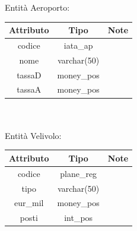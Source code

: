 \documentclass[a4paper,12pt]{report}
\begin{document}
      Entità Aeroporto: \\
      \begin{tabular}{|c|c|c|}
        \hline Attributo & Tipo & Note \\
        \hline codice & iata\_ap & \\
        \hline nome & varchar(50) & \\
        \hline tassaD & money\_pos & \\
        \hline tassaA & money\_pos & \\
        \hline
      \end{tabular} \\ \\
      Entità Velivolo: \\
      \begin{tabular}{|c|c|c|}
        \hline Attributo & Tipo & Note \\
        \hline codice & plane\_reg & \\
        \hline tipo & varchar(50) & \\
        \hline eur\_mil & money\_pos & \\
        \hline posti & int\_pos & \\
        \hline
      \end{tabular} \\ \\

      \newpage
\end{document}
